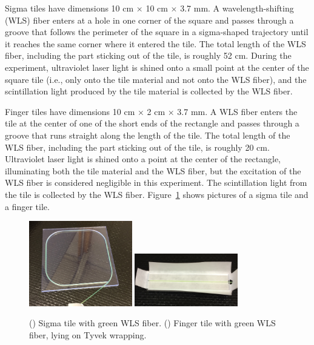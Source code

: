 Sigma tiles have dimensions 10 cm $\times$ 10 cm $\times$ 3.7 mm. A wavelength-shifting (WLS) fiber enters at a hole in one corner of the square and passes through a groove that follows the perimeter of the square in a sigma-shaped trajectory until it reaches the same corner where it entered the tile. The total length of the WLS fiber, including the part sticking out of the tile, is roughly 52 cm. During the experiment, ultraviolet laser light is shined onto a small point at the center of the square tile (i.e., only onto the tile material and not onto the WLS fiber), and the scintillation light produced by the tile material is collected by the WLS fiber.

Finger tiles have dimensions 10 cm $\times$ 2 cm $\times$ 3.7 mm. A WLS fiber enters the tile at the center of one of the short ends of the rectangle and passes through a groove that runs straight along the length of the tile. The total length of the WLS fiber, including the part sticking out of the tile, is roughly 20 cm. Ultraviolet laser light is shined onto a point at the center of the rectangle, illuminating both the tile material and the WLS fiber, but the excitation of the WLS fiber is considered negligible in this experiment. The scintillation light from the tile is collected by the WLS fiber. Figure~\ref{fig:sigma-finger} shows pictures of a sigma tile and a finger tile.

\begin{figure}[hbtp]
\begin{center}
\includegraphics[width=0.4\textwidth]{figures/sigma}
\includegraphics[width=0.4\textwidth]{figures/finger-horizontal}
\caption{(\cmsLeft) Sigma tile with green WLS fiber. (\cmsRight) Finger tile with green WLS fiber, lying on Tyvek wrapping.}
\label{fig:sigma-finger}
\end{center}
\end{figure}

